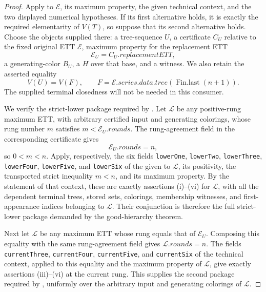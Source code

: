 \begin{proof}
Apply  to
\(\mathcal E\), its maximum property, the given technical context, and the
two displayed numerical hypotheses.  If its first alternative holds, it is
exactly the required elementarity of \(V(T)\), so suppose that its second
alternative holds.  Choose the objects supplied there: a tree-sequence
\(U\), a  certificate \(C_U\)
relative to the fixed original ETT \(\mathcal E\), maximum property for the
replacement ETT
\[
                   \mathcal E_U=C_U.\mathit{replacementETT},
\]
a generating-color  \(B_U\), a
 \(H\) over that base, and a
 witness.  We also retain the asserted equality
\[
 V(U)=V(F),\qquad
 F=\mathcal E.\mathit{series.data.tree}
       (\operatorname{Fin.last}(n+1)).                         \tag{1}
\]
The supplied terminal closedness will not be needed in this consumer.

We verify the strict-lower package required by
.  Let \(\mathcal L\) be any
positive-rung maximum ETT, with arbitrary certified input and generating
colorings, whose rung number \(m\) satisfies
\(m<\mathcal E_U.\mathit{rounds}\).  The rung-agreement field in the
corresponding certificate gives
\[
             \mathcal E_U.\mathit{rounds}=n,
\]
so \(0<m<n\).  Apply, respectively, the six fields
\texttt{lowerOne}, \texttt{lowerTwo}, \texttt{lowerThree},
\texttt{lowerFour}, \texttt{lowerFive}, and \texttt{lowerSix} of the
given  to \(\mathcal L\), its positivity,
the transported strict inequality \(m<n\), and its maximum property.  By
the statement of that context, these are exactly assertions (i)--(vi) for
\(\mathcal L\), with all the dependent terminal trees, stored sets,
colorings, membership witnesses, and first-appearance indices belonging to
\(\mathcal L\).  Their conjunction is therefore the full strict-lower
package demanded by the good-hierarchy theorem.

Next let \(\mathcal L\) be any maximum ETT whose rung equals that of
\(\mathcal E_U\).  Composing this equality with the same rung-agreement
field gives
\(\mathcal L.\mathit{rounds}=n\).  The fields
\texttt{currentThree}, \texttt{currentFour}, \texttt{currentFive}, and
\texttt{currentSix} of the technical context, applied to this equality and
the maximum property of \(\mathcal L\), give exactly assertions
(iii)--(vi) at the current rung.  This supplies the second package required
by , uniformly over the arbitrary
input and generating colorings of \(\mathcal L\).


\end{proof}
